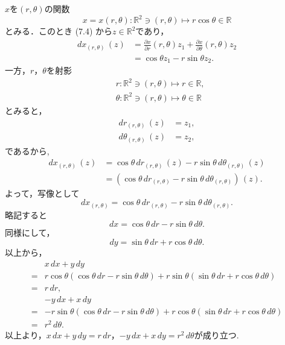 \begin{tanswer}
  $x$を$(r,\theta)$の関数
  \[
    x = x(r,\theta) \colon \mathbb{R}^2 \ni (r,\theta) \mapsto r \cos \theta \in\mathbb{R}
  \]
  とみる．このとき (7.4) から$ z\in \mathbb{R}^2$であり，
  \begin{align*}
    dx_{(r,\theta)} \, (z) & = \frac{\partial x}{\partial r} (r,\theta) z_1 + \frac{\partial x}{\partial \theta} (r,\theta) z_2 \\
                           & = \cos \theta z_1 - r \sin \theta z_2.
  \end{align*}
  一方，$r$，$\theta$を射影
  \begin{align*}
     & r \colon \mathbb{R}^2 \ni (r,\theta) \mapsto r \in \mathbb{R} ,         \\
     & \theta \colon \mathbb{R}^2 \ni (r,\theta) \mapsto \theta \in \mathbb{R}
  \end{align*}
  とみると，
  \begin{align*}
    dr_{(r,\theta)} \, (z)      & = z_1, \\
    d\theta_{(r,\theta)} \, (z) & = z_2,
  \end{align*}
  であるから,
  \begin{align*}
    dx_{(r,\theta)} \, (z) & = \cos \theta \, d r_{(r,\theta)} \, (z) - r \sin \theta \, d \theta_{(r,\theta)} \, (z) \\
                           & = (\cos \theta \, d r_{(r,\theta)} - r \sin \theta \, d \theta_{(r,\theta)}) \, (z).
  \end{align*}
  よって，写像として
  \[
    dx_{(r,\theta)} = \cos \theta \,dr_{(r,\theta)} - r \sin \theta \,d \theta_{(r,\theta)}.
  \]
  略記すると
  \[
    dx = \cos \theta \,dr - r \sin \theta \,d \theta.
  \]
  同様にして，
  \[
    dy = \sin \theta \,dr + r \cos \theta \,d \theta.
  \]
  以上から，
  \begin{align*}
      & x \, dx +y \, dy                                                                                                          \\
    = & r \cos \theta(\cos \theta \, dr - r \sin \theta \, d \theta)+r \sin \theta(\sin \theta \, dr + r \cos \theta \, d \theta) \\
    = & r \, dr,                                                                                                                  \\
      & -y \, dx + x \, dy                                                                                                        \\
    = & -r \sin \theta (\cos \theta  \, dr -r\sin \theta \, d\theta)+r \cos \theta (\sin \theta \, dr + r \cos \theta \, d\theta) \\
    = & r^2 \, d \theta.
  \end{align*}
  以上より，$x \, dx +y \, dy = r \, dr$，$-y \, dx + x \, dy  = r^2 \, d \theta$が成り立つ.
\end{tanswer}

